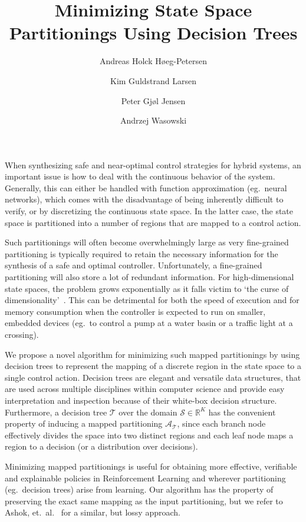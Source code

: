 \documentclass{easychair}
\title{%
    Minimizing State Space Partitionings Using Decision Trees
}
\author{%
    Andreas Holck Høeg-Petersen\inst{1}
    \and
    Kim Guldstrand Larsen\inst{1}
    \and
    Peter Gjøl Jensen\inst{1}
    \and
    Andrzej Wasowski\inst{2}
}
\institute{%
    Aalborg University, Aalborg, Denmark \\
    \email{ahhp@cs.aau.dk, kgl@cs.aau.dk, pgj@cs.aau.dk}
    \and
    IT University of Copenhagen, Copenhagen, Denmark \\
    \email{wasowski@itu.dk}
}
\begin{document}
\maketitle

\noindent
When synthesizing safe and near-optimal control strategies for hybrid systems,
an important issue is how to deal with the continuous behavior of the system.
Generally, this can either be handled with function approximation
(eg.\ neural networks), which comes with the disadvantage of being inherently
difficult to verify, or by discretizing the continuous state space. In the
latter case, the state space is partitioned into a number of regions that are
mapped to a control action.

Such partitionings will often become overwhelmingly large as very fine-grained
partitioning is typically required to retain the necessary information for the
synthesis of a safe and optimal controller. Unfortunately, a fine-grained
partitioning will also store a lot of redundant information. For
high-dimensional state spaces, the problem grows exponentially as it falls
victim to `the curse of
dimensionality'~\cite{bellmanAdaptiveControlProcesses1959}. This can be
detrimental for both the speed of execution and for memory consumption when the
controller is expected to run on smaller, embedded devices (eg.\ to control a
pump at a water basin or a traffic light at a crossing).

We propose a novel algorithm for minimizing such mapped partitionings by
using decision trees to represent the mapping of a discrete region in the state
space to a single control action. Decision trees are elegant and versatile data
structures, that are used across multiple disciplines within computer science
and provide easy interpretation and inspection because of their white-box
decision structure. Furthermore, a decision tree $\mathcal{T}$ over the domain
$\mathcal{S} \in \mathbb{R}^{K}$ has the convenient property of inducing a
mapped partitioning $\mathcal{A}_{\mathcal{T}}$, since each branch node
effectively divides the space into two distinct regions and each leaf node maps
a region to a decision (or a distribution over decisions).

Minimizing mapped partitionings is useful for obtaining more effective,
verifiable and explainable policies in Reinforcement Learning and wherever
partitioning (eg.\ decision trees) arise from learning. Our algorithm has the
property of preserving the exact same mapping as the input partitioning, but we
refer to Ashok, et.\ al.\ \cite{ashokDtControlDecisionTree2020a} for a similar,
but lossy approach.
\end{document}
